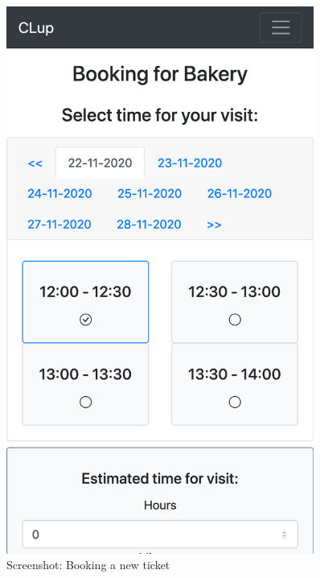 \begin{figure}[H]
\begin{minipage}{0.45\textwidth}
        \includegraphics[width=0.9\textwidth]{Images/Screenshots/booking.png} %
        \caption{Screenshot: Booking a new ticket}
    \end{minipage}
\end{figure}

